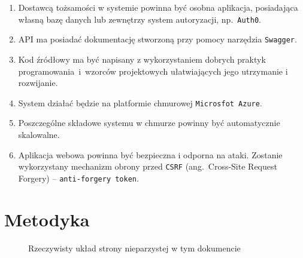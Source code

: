\begin{enumerate}[labelwidth=\widthof{\ref{last-item}},label=\arabic*.]
\item Dostawcą tożsamości w systemie powinna być osobna aplikacja, posiadająca własną bazę danych lub zewnętrzy system autoryzacji, np.~\texttt{Auth0}.

\item API ma posiadać dokumentację stworzoną przy pomocy narzędzia \texttt{Swagger}.

\item Kod źródłowy ma być napisany z wykorzystaniem dobrych praktyk programowania~i~wzorców projektowych ułatwiających jego utrzymanie i rozwijanie.

\item System działać będzie na platformie chmurowej \texttt{Microsfot Azure}.

\item Poszczególne składowe systemu w chmurze powinny być automatycznie skalowalne.

\item Aplikacja webowa powinna być bezpieczna i odporna na ataki. Zostanie wykorzystany mechanizm obrony przed \texttt{CSRF} (ang.~Cross-Site Request Forgery) -- \texttt{anti-forgery token}.

\end{enumerate}

\section{Metodyka}
\label{sec:metodyka}













\begin{figure}[b]
\currentstock
\oddpagelayouttrue
\twocolumnlayoutfalse
\drawmarginparstrue
\drawparametersfalse
\drawstock
\caption{Rzeczywisty układ strony nieparzystej w tym dokumencie} \label{fig:currentPageLayout}
\end{figure}







